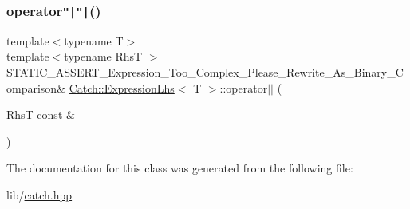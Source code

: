 \subsubsection{\texorpdfstring{operator\texttt{"|}\texttt{"|}()}{operator||()}}
{\footnotesize\ttfamily template$<$typename T$>$ \\
template$<$typename RhsT $>$ \\
S\+T\+A\+T\+I\+C\+\_\+\+A\+S\+S\+E\+R\+T\+\_\+\+Expression\+\_\+\+Too\+\_\+\+Complex\+\_\+\+Please\+\_\+\+Rewrite\+\_\+\+As\+\_\+\+Binary\+\_\+\+Comparison\& \hyperlink{class_catch_1_1_expression_lhs}{Catch\+::\+Expression\+Lhs}$<$ T $>$\+::operator$\vert$$\vert$ (\begin{DoxyParamCaption}\item[{RhsT const \&}]{ }\end{DoxyParamCaption})}



The documentation for this class was generated from the following file\+:\begin{DoxyCompactItemize}
\item 
lib/\hyperlink{catch_8hpp}{catch.\+hpp}\end{DoxyCompactItemize}
